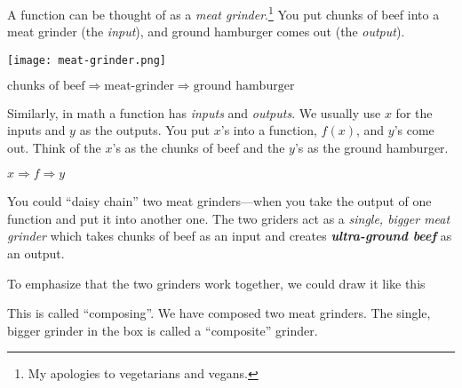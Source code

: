 \documentclass[fleqn,letterpaper,12pt,printwatermark=false]{memoir}
\begin{document}
\begin{myLesson}
    A function can be thought of as a \emph{meat grinder}.\footnote{
        My apologies to vegetarians and vegans.
    }
    You put chunks of beef into a meat grinder (the \emph{input}),
    and ground hamburger comes out (the \emph{output}). 

    \begin{center}
    \texttt{[image: meat-grinder.png]} 
    \end{center}

    \begin{center}
    \(
        \text{chunks of beef}
        \Longrightarrow
        \text{meat-grinder}
        \Longrightarrow
        \text{ground hamburger}
    \)
    \end{center}

    Similarly,
    in math a function has \emph{inputs} and \emph{outputs}.
    We usually use $x$ for the inputs and $y$ as the outputs.
    You put $x$'s into a function, $f(x)$,
    and $y$'s come out.
    Think of the $x$'s as the chunks of beef
    and the $y$'s as the ground hamburger.
    \begin{center}
    \(
        x
        \Longrightarrow
        f
        \Longrightarrow
        y
    \)
    \end{center}

    You could ``daisy chain'' two meat grinders---when 
    you take the output of one function and put it into
    another one.
    The two griders act as a  
    \emph{single, bigger meat grinder} which takes chunks of beef
    as an input and creates 
    {\bfseries\itshape ultra-ground beef} as an output.

    \begin{center}
    \end{center}
    To emphasize that the two grinders work together, 
    we could draw it like this
    \begin{center}
    \end{center}
    This is called ``composing''. 
    We have composed two meat grinders.
    The single, bigger grinder in the box is called 
    a ``composite'' grinder.


\end{myLesson}
\end{document}
